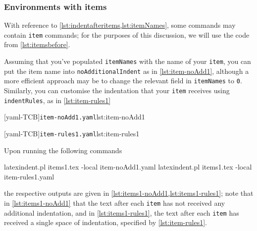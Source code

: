 \subsubsection{Environments with items}
	With reference to \vref{lst:indentafteritems,lst:itemNames}, some commands
	may contain \texttt{item} commands; for the purposes of this discussion,
	we will use the code from \vref{lst:itemsbefore}.

	Assuming that you've populated \texttt{itemNames} with the name of your
	\texttt{item}, you can put the item name into \texttt{noAdditionalIndent}
	as in \cref{lst:item-noAdd1}, although a more efficient approach may be
	to change the relevant field in \texttt{itemNames} to \texttt{0}. Similarly,
	you can customise the indentation that your \texttt{item} receives using
	\texttt{indentRules}, as in \cref{lst:item-rules1}

	\begin{minipage}{.45\textwidth}
		[yaml-TCB]{\texttt{item-noAdd1.yaml}}{lst:item-noAdd1}
	\end{minipage}%
	\hfill
	\begin{minipage}{.45\textwidth}
		[yaml-TCB]{\texttt{item-rules1.yaml}}{lst:item-rules1}
	\end{minipage}

	Upon running the following commands
	\begin{commandshell}
latexindent.pl items1.tex -local item-noAdd1.yaml  
latexindent.pl items1.tex -local item-rules1.yaml  
\end{commandshell}
	the respective outputs are given in \cref{lst:items1-noAdd1,lst:items1-rules1}; note that in \cref{lst:items1-noAdd1}
	that the text after each \texttt{item} has not received any additional indentation, and in \cref{lst:items1-rules1},
	the text after each \texttt{item} has received a single space of indentation, specified by \cref{lst:item-rules1}.

	\begin{minipage}{.45\textwidth}
	\end{minipage}
	\hfill
	\begin{minipage}{.45\textwidth}
	\end{minipage}

